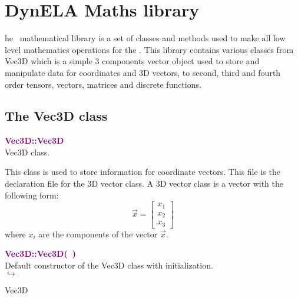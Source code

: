 %
%
%
\chapter{DynELA Maths library}

\startcontents[chapters]
\printmyminitoc[2]he \DynELA~mathematical library is a set of classes and methods used to make all low level mathematics operations for the \DynELA. This library contains various classes from Vec3D which is a simple 3 components vector object used to store and manipulate data for coordinates and 3D vectors, to second, third and fourth order tensors, vectors, matrices and discrete functions.

\section{The Vec3D class}

\textcolor{purple}{\textbf{Vec3D::Vec3D}}\label{Vec3D::Vec3D}\\
Vec3D class.

This class is used to store information for coordinate vectors.
This file is the declaration file for the 3D vector class.
A 3D vector class is a vector with the following form:
\begin{equation*}
\overrightarrow{x}=\left[\begin{array}{c}
  x_{1}\\
  x_{2}\\
  x_{3}
  \end{array}\right]
\end{equation*}
where $x_{i}$ are the components of the vector $\overrightarrow{x}$.

\textcolor{purple}{\textbf{Vec3D::Vec3D(~)}}\label{Vec3D::Vec3D()}\\
Default constructor of the Vec3D class with initialization.\\ \hspace*{5mm}$\hookrightarrow$
\vspace*{-2em}\begin{tcolorbox}[grow to left by=-1cm, width=\textwidth-1cm,myArgs,tabularx={l|R}]
Vec3D
\end{tcolorbox}

